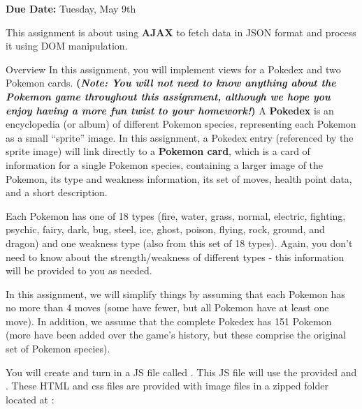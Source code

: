 \documentclass[programming]{../../../../mfcs}
\newcommand{\projectduedate}{Tuesday, May 9th}
\begin{document}
\vspace{-3.8em}

\hfill\begin{varwidth}{0.5\textwidth}
{\large {\bf\color{colour} Due Date:} \projectduedate}
\end{varwidth}
\vspace{2em}

This assignment is about using \textbf{AJAX} to fetch data in JSON format and process it using DOM
manipulation. 

\newline

\vspace{2em}
\begin{question}{Overview}
In this assignment, you will implement views for a Pokedex and two Pokemon cards.
\textbf{(\emph{Note: You
will not need to know anything about the Pokemon game throughout this assignment, although we hope
you enjoy having a more fun twist to your homework!})} A \textbf{Pokedex} is an encyclopedia (or
album) of different Pokemon species, representing each Pokemon as a small ``sprite'' image. In
this assignment, a Pokedex entry (referenced by the sprite image) will link directly to a
\textbf{Pokemon card}, which is a card of information for a single Pokemon species, containing a
larger image of the Pokemon, its type and
weakness information, its set of moves, health point data, and a short description. 
\newline

  Each Pokemon has one of 18 types (fire, water, grass, normal, electric, fighting, psychic,
  fairy, dark, bug, steel, ice, ghost, poison,
  flying, rock, ground, and dragon) and one weakness type (also from this set of 18 types). Again,
  you don't need to know about the strength/weakness of different types - this information will be
  provided to you as needed.
  \newline
  
  In this assignment, we will simplify things by assuming that each Pokemon has no more than 4 moves (some
  have fewer, but all Pokemon have at least one move). In addition, we assume that the complete
  Pokedex has 151 Pokemon (more have been added over the game's history, but these comprise the original set of Pokemon species).
  \newline
 
  You will create and turn in a JS file called \texttt{\textbf{\color{colour}{pokedex.js}}}.
  This JS file will use the provided \texttt{\textbf{\color{colour}{pokedex.html}}} and \texttt{\textbf{\color{colour}{pokedex.css}}}.
  These HTML and css files are provided with image files in a zipped folder located at
  \newline\texttt{\textbf{\color{colour}{https://webster.cs.washington.edu/pokedex/resources.zip}}}:
\newline


\end{question}
\end{document}
